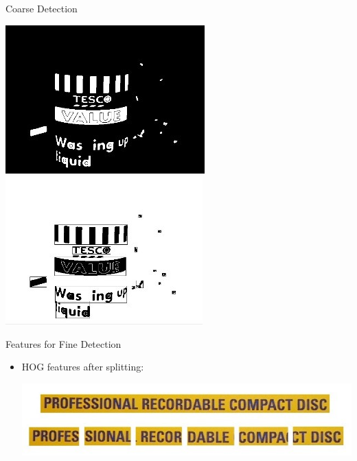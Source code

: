 \documentclass[a0paper,portrait]{baposter}
\begin{document}
\begin{poster}
\begin{posterbox}[name=example,span=2,column=1,row=0]{Coarse Detection}
\begin{center}
  \includegraphics[width=1.45\headerheight]{step5.jpg}
  \includegraphics[width=1.45\headerheight]{step6.jpg}
  \label{fig:figlabel}
\end{center}
\end{posterbox}






\begin{posterbox}[name=feature,column=1,below = example]{Features for Fine Detection}

\begin{itemize}
  \item HOG features after splitting:
    \begin{center}
    \includegraphics[width=1.8\headerheight]{split.jpg}
    \label{fig:figlabel}
    \end{center}


\end{itemize}
\end{posterbox}
\end{poster}
\end{document}
